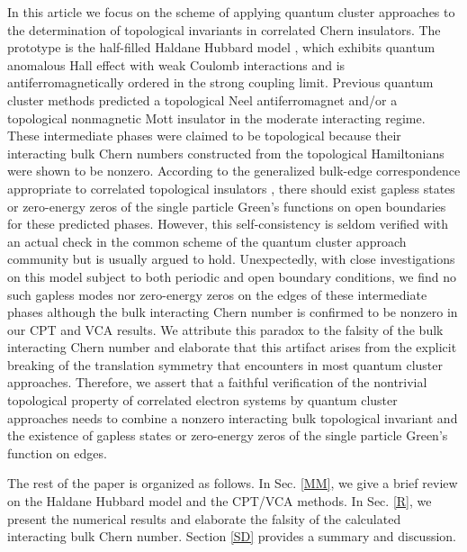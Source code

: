 \documentclass[12pt]{iopart}
\begin{document}
\par In this article we focus on the scheme of applying quantum cluster approaches to the determination of topological invariants in correlated Chern insulators. The prototype is the half-filled Haldane Hubbard model \cite{HZKL_PRB2011-1,HZKL_PRB2011-2,MR_PRB2013,HRP_PRB2015,ZSWZ_PRB2015,HCPP_PRL2016,VSLTHT_PRL2016,IWT_PRB2016,ASHP_PRB2016,GJMP_PRB2016,GR_NJP2018,LTTNNH_PBCM2018}, which exhibits quantum anomalous Hall effect with weak Coulomb interactions and is antiferromagnetically ordered in the strong coupling limit. Previous quantum cluster methods \cite{WFSM_PRB2016} predicted a topological Neel antiferromagnet and/or a topological nonmagnetic Mott insulator in the moderate interacting regime. These intermediate phases were claimed to be topological because their interacting bulk Chern numbers constructed from the topological Hamiltonians were shown to be nonzero. According to the generalized bulk-edge correspondence appropriate to correlated topological insulators \cite{G_PRB2011,EG_PRB2011}, there should exist gapless states or zero-energy zeros of the single particle Green's functions on open boundaries for these predicted phases. However, this self-consistency is seldom verified with an actual check in the common scheme of the quantum cluster approach community but is usually argued to hold. Unexpectedly, with close investigations on this model subject to both periodic and open boundary conditions, we find no such gapless modes nor zero-energy zeros on the edges of these intermediate phases although the bulk interacting Chern number is confirmed to be nonzero in our CPT and VCA results. We attribute this paradox to the falsity of the bulk interacting Chern number and elaborate that this artifact arises from the explicit breaking of the translation symmetry that encounters in most quantum cluster approaches. Therefore, we assert that a faithful verification of the nontrivial topological property of correlated electron systems by quantum cluster approaches needs to combine a nonzero interacting bulk topological invariant and the existence of gapless states or zero-energy zeros of the single particle Green's function on edges.

\par The rest of the paper is organized as follows. In Sec. \ref{MM}, we give a brief review on the Haldane Hubbard model and the CPT/VCA methods. In Sec. \ref{R}, we present the numerical results and elaborate the falsity of the calculated interacting bulk Chern number. Section \ref{SD} provides a summary and discussion.
\end{document}

